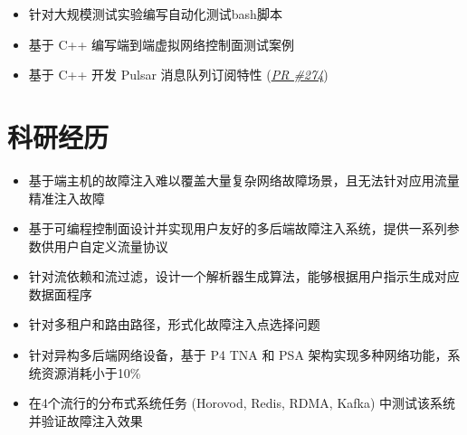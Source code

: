 \documentclass{resume}
\begin{document}

\begin{itemize}[parsep=0.5ex]
  \item 针对大规模测试实验编写自动化测试bash脚本
  \item 基于 C++ 编写端到端虚拟网络控制面测试案例
  \item 基于 C++ 开发 Pulsar 消息队列订阅特性 (\href{https://github.com/futurewei-cloud/alcor-control-agent/pull/274}{\textit{PR \#274}})
\end{itemize}

\section{科研经历}

\begin{itemize}[parsep=0.5ex]
  \item 基于端主机的故障注入难以覆盖大量复杂网络故障场景，且无法针对应用流量精准注入故障
  \item 基于可编程控制面设计并实现用户友好的多后端故障注入系统，提供一系列参数供用户自定义流量协议
  \item 针对流依赖和流过滤，设计一个解析器生成算法，能够根据用户指示生成对应数据面程序
  \item 针对多租户和路由路径，形式化故障注入点选择问题
  \item 针对异构多后端网络设备，基于 P4 TNA 和 PSA 架构实现多种网络功能，系统资源消耗小于10\%
  \item 在4个流行的分布式系统任务 (Horovod, Redis, RDMA, Kafka) 中测试该系统并验证故障注入效果
\end{itemize}
\end{document}
